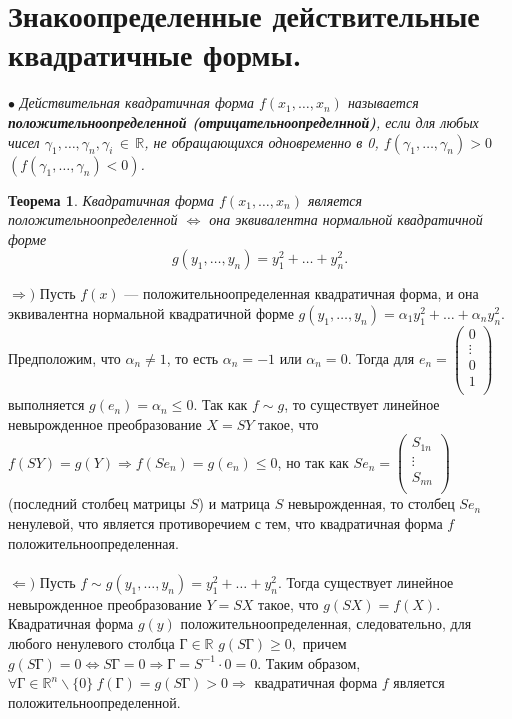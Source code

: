 \section{Знакоопределенные действительные квадратичные формы.}
$\bullet$ \textit{Действительная квадратичная форма $f(x_1,\dots,x_n)$ называется \textbf{положительноопределенной (отрицательноопределнной)}, если для любых чисел $\gamma_1,\dots,\gamma_n, \gamma_i\, \in\, \mathbb{R}$, не обращающихся одновременно в 0, $f(\gamma_1,\dots,\gamma_n)>0$  $(f(\gamma_1,\dots,\gamma_n)<0)$.}
\newtheorem*{th13_5_1}{Теорема}\begin{th13_5_1}Квадратичная форма $f(x_1,\dots,x_n)$ является положительноопределенной $\Longleftrightarrow$ она эквивалентна нормальной квадратичной форме $$g(y_1,\dots,y_n) = y_1^2 + \ldots + y_n^2.$$
\end{th13_5_1}\begin{Proof}
	$\Rightarrow)$ Пусть $f(x)$ --- положительноопределенная квадратичная форма, и она эквивалентна нормальной квадратичной форме $g(y_1,\dots,y_n)=\alpha_1 y_1^2+ \ldots +\alpha_n y_n^2$. Предположим, что $\alpha_n \ne 1$, то есть $\alpha_n = -1$ или $\alpha_n = 0$. Тогда для  $e_n=\begin{pmatrix}
		0\\
		\vdots\\
		0\\
		1\\
	\end{pmatrix}$ выполняется $g(e_n)=\alpha_n \leqslant 0$. Так как $f \sim g$, то существует линейное невырожденное преобразование $X=SY$ такое, что $f(SY)=g(Y) \Rightarrow f(S e_n) = g(e_n) \leqslant 0$, но так как $Se_n = \begin{pmatrix}
		S_{1n}\\
		\vdots\\
		S_{nn}\\
	\end{pmatrix}$ (последний столбец матрицы $S$) и матрица $S$ невырожденная, то столбец $Se_n$ ненулевой, что является противоречием с тем, что квадратичная форма $f$ положительноопределенная.\\\\
	$\Leftarrow)$ Пусть $f \sim g(y_1,\dots,y_n)=y_1^2+ \ldots +y_n^2$. Тогда существует линейное невырожденное преобразование $Y=SX$ такое, что $g(SX)=f(X)$.
	Квадратичная форма $g(y)$ положительноопределенная, следовательно, для любого ненулевого столбца $\text{Г}\in\mathbb{R}$ $g(S\text{Г})\geqslant0,$ причем $g(S\text{Г})=0 \Leftrightarrow S\text{Г}=0\Rightarrow \text{Г}=S^{-1}\cdot 0 = 0$. Таким образом, $\forall\text{Г}\in\mathbb{R}^n\backslash\{0\}\ f(\text{Г}) = g(S\text{Г}) >0\Rightarrow$ квадратичная форма $f$ является положительноопределенной.
\end{Proof}
